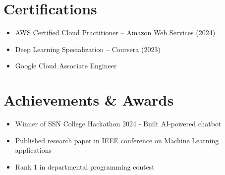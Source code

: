 \documentclass[a4paper,10pt]{article}
\newcommand{\resumeSubHeadingListStart}{\begin{itemize}[leftmargin=0.15in, label={}]}
\newcommand{\resumeSubHeadingListEnd}{\end{itemize}}
\begin{document}
\section{Certifications}
\resumeSubHeadingListStart
    \item \small{AWS Certified Cloud Practitioner -- Amazon Web Services (2024)}
      \item \small{Deep Learning Specialization -- Coursera (2023)}
      \item \small{Google Cloud Associate Engineer}
  \resumeSubHeadingListEnd
\vspace{4pt}

\section{Achievements \& Awards}
\resumeSubHeadingListStart
  \item \small{Winner of SSN College Hackathon 2024 - Built AI-powered chatbot}
  \item \small{Published research paper in IEEE conference on Machine Learning applications}
  \item \small{Rank 1 in departmental programming contest}
\resumeSubHeadingListEnd
\vspace{4pt}
\end{document}
